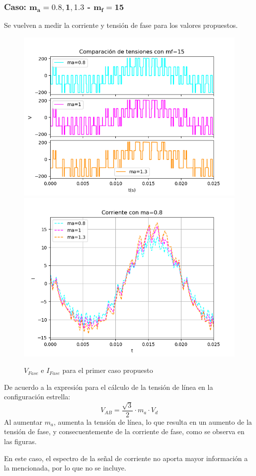 \documentclass[e4_tp3_main.tex]{subfiles}
\begin{document}
\subsubsection{Caso: $\mathbf{m_a = 0.8,1,1.3}$ - $\mathbf{m_f = 15}$}
Se vuelven a medir la corriente y tensión de fase para los valores propuestos.
\begin{figure}[H]
\centering
\includegraphics[width=0.49\linewidth]{Imagenes/Ej2b_V.png}
\includegraphics[width=0.49\linewidth]{Imagenes/Ej2b_I.png}
\caption{$V_{Fase}$ e $I_{Fase}$ para el primer caso propuesto}
\end{figure}

De acuerdo a la expresión para el cálculo de la tensión de línea en la configuración estrella:
\[
V_{AB} = \frac{\sqrt{3}}{2} \cdot m_a \cdot V_d
\]
Al aumentar $m_a$, aumenta la tensión de línea, lo que resulta en un aumento de la tensión de fase, y consecuentemente de la corriente de fase, como se observa en las figuras.\par
En este caso, el espectro de la señal de corriente no aporta mayor información a la mencionada, por lo que no se incluye.
\end{document}
